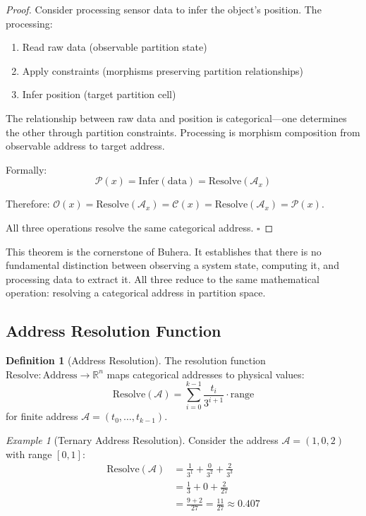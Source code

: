 \documentclass[twocolumn,10pt]{article}
\theoremstyle{definition}
\newtheorem{definition}[theorem]{Definition}
\theoremstyle{remark}
\newtheorem{example}[theorem]{Example}
\newcommand{\cataddr}{\mathcal{A}}
\begin{document}
\begin{proof}
Consider processing sensor data to infer the object's position. The processing:
\begin{enumerate}
    \item Read raw data (observable partition state)
    \item Apply constraints (morphisms preserving partition relationships)
    \item Infer position (target partition cell)
\end{enumerate}

The relationship between raw data and position is categorical—one determines the other through partition constraints. Processing is morphism composition from observable address to target address.

Formally:
\begin{equation}
    \mathcal{P}(x) = \text{Infer}(\text{data}) = \text{Resolve}(\cataddr_x)
\end{equation}

Therefore: $\mathcal{O}(x) = \text{Resolve}(\cataddr_x) = \mathcal{C}(x) = \text{Resolve}(\cataddr_x) = \mathcal{P}(x)$.

All three operations resolve the same categorical address. $\square$
\end{proof}

This theorem is the cornerstone of Buhera. It establishes that there is no fundamental distinction between observing a system state, computing it, and processing data to extract it. All three reduce to the same mathematical operation: resolving a categorical address in partition space.

\subsection{Address Resolution Function}

\begin{definition}[Address Resolution]
The resolution function $\text{Resolve}: \text{Address} \to \mathbb{R}^n$ maps categorical addresses to physical values:
\begin{equation}
    \text{Resolve}(\cataddr) = \sum_{i=0}^{k-1} \frac{t_i}{3^{i+1}} \cdot \text{range}
\end{equation}
for finite address $\cataddr = (t_0, \ldots, t_{k-1})$.
\end{definition}

\begin{example}[Ternary Address Resolution]
Consider the address $\cataddr = (1, 0, 2)$ with range $[0, 1]$:
\begin{align}
    \text{Resolve}(\cataddr) &= \frac{1}{3^1} + \frac{0}{3^2} + \frac{2}{3^3} \\
    &= \frac{1}{3} + 0 + \frac{2}{27} \\
    &= \frac{9 + 2}{27} = \frac{11}{27} \approx 0.407
\end{align}
\end{example}
\end{document}
